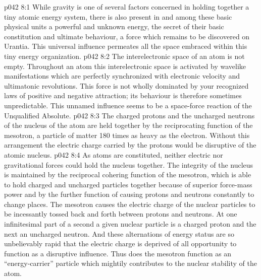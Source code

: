 \vs p042 8:1 While gravity is one of several factors concerned in holding together a tiny atomic energy system, there is also present in and among these basic physical units a powerful and unknown energy, the secret of their basic constitution and ultimate behaviour, a force which remains to be discovered on Urantia. This universal influence permeates all the space embraced within this tiny energy organization.
\vs p042 8:2 The interelectronic space of an atom is not empty. Throughout an atom this interelectronic space is activated by wavelike manifestations which are perfectly synchronized with electronic velocity and ultimatonic revolutions. This force is not wholly dominated by your recognized laws of positive and negative attraction; its behaviour is therefore sometimes unpredictable. This unnamed influence seems to be a space\hyp{}force reaction of the Unqualified Absolute.
\vs p042 8:3 \pc The charged protons and the uncharged neutrons of the nucleus of the atom are held together by the reciprocating function of the mesotron, a particle of matter 180 times as heavy as the electron. Without this arrangement the electric charge carried by the protons would be disruptive of the atomic nucleus.
\vs p042 8:4 As atoms are constituted, neither electric nor gravitational forces could hold the nucleus together. The integrity of the nucleus is maintained by the reciprocal cohering function of the mesotron, which is able to hold charged and uncharged particles together because of superior force\hyp{}mass power and by the further function of causing protons and neutrons constantly to change places. The mesotron causes the electric charge of the nuclear particles to be incessantly tossed back and forth between protons and neutrons. At one infinitesimal part of a second a given nuclear particle is a charged proton and the next an uncharged neutron. And these alternations of energy status are so unbelievably rapid that the electric charge is deprived of all opportunity to function as a disruptive influence. Thus does the mesotron function as an “energy\hyp{}carrier” particle which mightily contributes to the nuclear stability of the atom.
